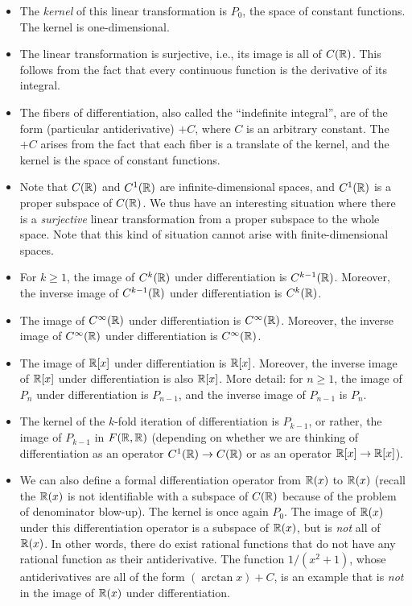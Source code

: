\documentclass[10pt]{amsart}
\begin{document}
\begin{itemize}
\item The {\em kernel} of this linear transformation is $P_0$, the
  space of constant functions. The kernel is one-dimensional.
\item The linear transformation is surjective, i.e., its image is all
  of $C(\mathbb{R})$. This follows from the fact that every continuous
  function is the derivative of its integral.
\item The fibers of differentiation, also called the ``indefinite
  integral'', are of the form (particular antiderivative) $+ C$, where
  $C$ is an arbitrary constant. The $+ C$ arises from the fact that
  each fiber is a translate of the kernel, and the kernel is the space
  of constant functions.
\item Note that $C(\mathbb{R})$ and $C^1(\mathbb{R})$ are infinite-dimensional spaces,
  and $C^1(\mathbb{R})$ is a proper subspace of $C(\mathbb{R})$. We thus have an
  interesting situation where there is a {\em surjective} linear
  transformation from a proper subspace to the whole space. Note that
  this kind of situation cannot arise with finite-dimensional spaces.
\item For $k \ge 1$, the image of $C^k(\mathbb{R})$ under differentiation is
  $C^{k-1}(\mathbb{R})$. Moreover, the inverse image of $C^{k-1}(\mathbb{R})$ under
  differentiation is $C^k(\mathbb{R})$.
\item The image of $C^\infty(\mathbb{R})$ under differentiation is
  $C^\infty(\mathbb{R})$. Moreover, the inverse image of $C^\infty(\mathbb{R})$ under
  differentiation is $C^\infty(\mathbb{R})$.
\item The image of $\mathbb{R}[x]$ under differentiation is $\mathbb{R}[x]$. Moreover,
  the inverse image of $\mathbb{R}[x]$ under differentiation is also
  $\mathbb{R}[x]$. More detail: for $n \ge 1$, the image of $P_n$ under
  differentiation is $P_{n-1}$, and the inverse image of $P_{n-1}$ is
  $P_n$.
\item The kernel of the $k$-fold iteration of differentiation is
  $P_{k-1}$, or rather, the image of $P_{k-1}$ in $F(\mathbb{R},\mathbb{R})$
  (depending on whether we are thinking of differentiation as an
  operator $C^1(\mathbb{R}) \to C(\mathbb{R})$ or as an operator $\mathbb{R}[x]\to \mathbb{R}[x]$).
\item We can also define a formal differentiation operator from
  $\mathbb{R}(x)$ to $\mathbb{R}(x)$ (recall the $\mathbb{R}(x)$ is not identifiable with a
  subspace of $C(\mathbb{R})$ because of the problem of denominator
  blow-up). The kernel is once again $P_0$. The image of $\mathbb{R}(x)$ under
  this differentiation operator is a subspace of $\mathbb{R}(x)$, but is {\em
    not} all of $\mathbb{R}(x)$. In other words, there do exist rational
  functions that do not have any rational function as their
  antiderivative. The function $1/(x^2 + 1)$, whose antiderivatives
  are all of the form $(\arctan x) + C$, is an example that is {\em
    not} in the image of $\mathbb{R}(x)$ under differentiation.
\end{itemize}
\end{document}
